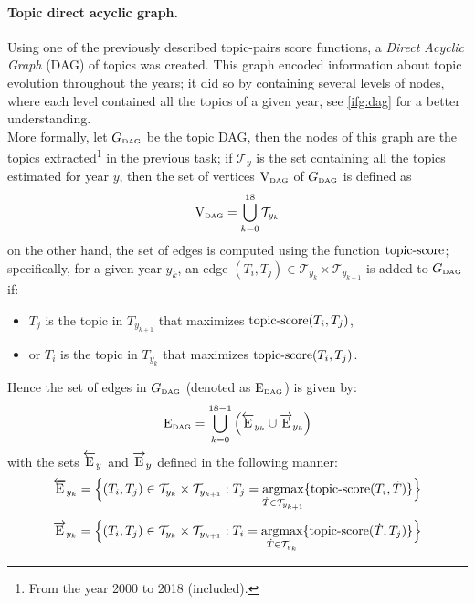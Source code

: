 \paragraph{\textbf{Topic direct acyclic graph.}}
Using one of the previously described topic-pairs score functions, a \textit{Direct Acyclic Graph} (DAG) of topics was created. This graph encoded information about topic evolution throughout the years; it did so by containing several levels of nodes, where each level contained all the topics of a given year, see \cref{ifg:dag} for a better understanding.\\
More formally, let $G_{\text{\tiny DAG}}$ be the topic DAG, then the nodes of this graph are the topics extracted\footnote{From the year 2000 to 2018 (included).} in the previous task; if $\mathcal{T}_y$ is the set containing all the topics estimated for year $y$, then the set of vertices $\mathrm{V}_{\text{\tiny DAG}}$ of $G_{\text{\tiny DAG}}$ is defined as
$$
\mathrm{V}_{\text{\tiny DAG}} = \bigcup_{k=0}^{18} \mathcal{T}_{y_k}
$$
on the other hand, the set of edges is computed using the function $\mathop{\mathrm{topic\text{-}score}}$; specifically, for a given year $y_{k}$, an edge $(T_i,T_j)\in \mathcal T_{y_k}\times\mathcal T_{y_{k+1}}$ is added to $G_{\text{\tiny DAG}}$ if:
\begin{itemize}
	\item $T_j$ is the topic in $T_{y_{k+1}}$ that maximizes $\mathop{\mathrm{topic\text{-}score}}(T_i,T_j)$,
	\item or $T_i$ is the topic in $T_{y_{k}}$ that maximizes $\mathop{\mathrm{topic\text{-}score}}(T_i,T_j)$.
\end{itemize}
Hence the set of edges in $G_{\text{\tiny DAG}}$ (denoted as $\mathrm{E}_{\text{\tiny DAG}}$) is given by:
$$
\mathrm{E}_{\text{\tiny DAG}} = \bigcup_{k=0}^{18-1} \Big(\overleftarrow{\mathrm{E}}_{y_k} \cup \overrightarrow{\mathrm{E}}_{y_k}\Big)
$$
with the sets $\overleftarrow{\mathrm{E}}_{y}$ and $\overrightarrow{\mathrm{E}}_{y}$ defined in the following manner:
\[
\overleftarrow{\mathrm{E}}_{y_k} = \Big\{(T_i, T_j) \in\mathcal T_{y_k}\times\mathcal T_{y_{k+1}}: T_j = \mathop{\mathrm{argmax}}_{\dot T\in \mathcal T_{y_{k+1}}} \{\mathop{\mathrm{topic\text{-}score}}(T_i, \dot T)\}  \Big\}
\]
\[
\overrightarrow{\mathrm{E}}_{y_k} = \Big\{(T_i, T_j) \in\mathcal T_{y_k}\times\mathcal T_{y_{k+1}}: T_i = \mathop{\mathrm{argmax}}_{\dot T\in \mathcal T_{y_k}} \{\mathop{\mathrm{topic\text{-}score}}(\dot T, T_j)\}  \Big\}
\]

